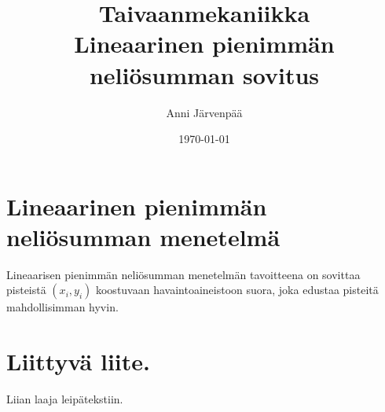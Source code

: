 \documentclass[12pt,a4paper,titlepage]{article}
\title{Taivaanmekaniikka \\ Lineaarinen pienimmän neliösumman sovitus \vspace{0.5em}}
\author{\begin{tabular}{c}
Anni Järvenpää
\end{tabular}}
\date{\today}
\begin{document}
\maketitle

\section{Lineaarinen pienimmän neliösumman menetelmä}
Lineaarisen pienimmän neliösumman menetelmän tavoitteena on sovittaa pisteistä $(x_i, y_i)$ koostuvaan havaintoaineistoon suora, joka edustaa pisteitä mahdollisimman hyvin. 



 
\appendix
\newpage
\section{Liittyvä liite.} \label{koodi}
Liian laaja leipätekstiin.
\end{document}
